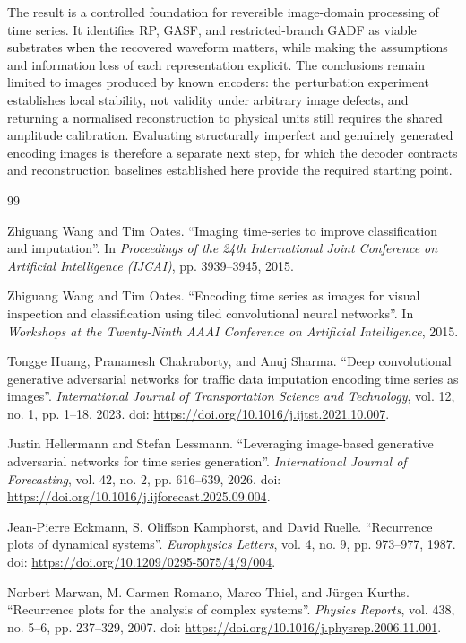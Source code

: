 \documentclass[5p]{elsarticle}
\begin{document}
The result is a controlled foundation for reversible image-domain processing of time series. It identifies RP, GASF, and restricted-branch GADF as viable substrates when the recovered waveform matters, while making the assumptions and information loss of each representation explicit. The conclusions remain limited to images produced by known encoders: the perturbation experiment establishes local stability, not validity under arbitrary image defects, and returning a normalised reconstruction to physical units still requires the shared amplitude calibration. Evaluating structurally imperfect and genuinely generated encoding images is therefore a separate next step, for which the decoder contracts and reconstruction baselines established here provide the required starting point.


\begin{thebibliography}{99}
\raggedright

Zhiguang Wang and Tim Oates. ``Imaging time-series to improve classification and imputation''. In \textit{Proceedings of the 24th International Joint Conference on Artificial Intelligence (IJCAI)}, pp. 3939--3945, 2015.

Zhiguang Wang and Tim Oates. ``Encoding time series as images for visual inspection and classification using tiled convolutional neural networks''. In \textit{Workshops at the Twenty-Ninth AAAI Conference on Artificial Intelligence}, 2015.

Tongge Huang, Pranamesh Chakraborty, and Anuj Sharma. ``Deep convolutional generative adversarial networks for traffic data imputation encoding time series as images''. \textit{International Journal of Transportation Science and Technology}, vol. 12, no. 1, pp. 1--18, 2023. doi: \url{https://doi.org/10.1016/j.ijtst.2021.10.007}.

Justin Hellermann and Stefan Lessmann. ``Leveraging image-based generative adversarial networks for time series generation''. \textit{International Journal of Forecasting}, vol. 42, no. 2, pp. 616--639, 2026. doi: \url{https://doi.org/10.1016/j.ijforecast.2025.09.004}.

Jean-Pierre Eckmann, S. Oliffson Kamphorst, and David Ruelle. ``Recurrence plots of dynamical systems''. \textit{Europhysics Letters}, vol. 4, no. 9, pp. 973--977, 1987. doi: \url{https://doi.org/10.1209/0295-5075/4/9/004}.

Norbert Marwan, M. Carmen Romano, Marco Thiel, and Jürgen Kurths. ``Recurrence plots for the analysis of complex systems''. \textit{Physics Reports}, vol. 438, no. 5--6, pp. 237--329, 2007. doi: \url{https://doi.org/10.1016/j.physrep.2006.11.001}.


\end{thebibliography}
\end{document}
